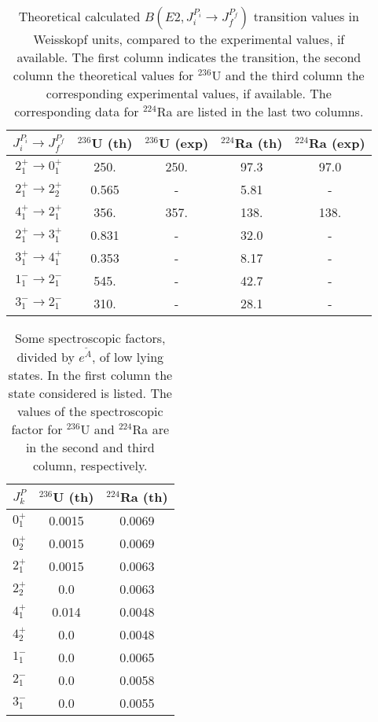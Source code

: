 \documentclass[12pt]{article}
\begin{document}
\begin{center}
\begin{table}[h!]
\centering
\begin{tabular}{|c|c|c|c|c|}
\hline\hline
$J_i^{P_i} \rightarrow J_f^{P_f}$ & $^{236}$U (th) & $^{236}$U (exp) & $^{224}$Ra (th) & 
$^{224}$Ra (exp) \\
\hline
$2_1^+ \rightarrow 0_1^+$ & 250. & 250. & 97.3 & 97.0 \\
$2_1^+ \rightarrow 2_2^+$ & 0.565 & - & 5.81 & - \\
$4_1^+ \rightarrow 2_1^+$ & 356. & 357.  & 138. &  138. \\
$2_1^+ \rightarrow 3_1^+$ & 0.831 & - & 32.0 & - \\
$3_1^+ \rightarrow 4_1^+$ & 0.353 & - & 8.17 & - \\
$1_1^- \rightarrow 2_1^-$ & 545. & - & 42.7 & - \\
$3_1^- \rightarrow 2_1^-$ & 310. & - & 28.1 & - \\
\hline 
 \end{tabular}
\caption{
Theoretical calculated $B(E2,J_i^{P_i} \rightarrow J_f^{P_f})$ transition values in Weisskopf
units, compared to the experimental values, if available. The first column indicates the transition,
the second column the theoretical values for $^{236}$U and the third column the corresponding
experimental values, if available. The corresponding data for $^{224}$Ra are listed in the 
last two columns. 
} 
\vspace{0.2cm}
\label{Trans-U-Ra}
\end{table}
\end{center}

\begin{center}
\begin{table}[h!]
\centering
\begin{tabular}{|c|c|c|}
\hline\hline
$J_k^P$ & $^{236}$U (th) & $^{224}$Ra (th) \\
\hline
$0_1^+$ & 0.0015 & 0.0069 \\
$0_2^+$ & 0.0015 & 0.0069 \\
$2_1^+$ & 0.0015 & 0.0063 \\
$2_2^+$ & 0.0 & 0.0063 \\
$4_1^+$ & 0.014 & 0.0048 \\
$4_2^+$ & 0.0  & 0.0048 \\
$1_1^-$ & 0.0  & 0.0065 \\
$2_1^-$ & 0.0  & 0.0058 \\
$3_1^-$ & 0.0  & 0.0055 \\
\hline
\hline 
 \end{tabular}
\caption{
Some spectroscopic factors, divided by $e^{\widetilde{A}}$, of low lying states. 
In the first column the state considered is listed.
The values of the spectroscopic factor for $^{236}$U and $^{224}$Ra
are in the second and third column, respectively.
} 
\vspace{0.2cm}
\label{Spec-U-Ra}
\end{table}
\end{center}
\end{document}
